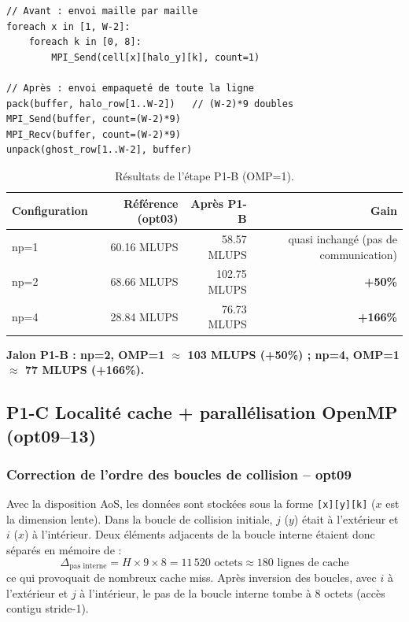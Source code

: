 \documentclass[a4paper,11pt,oneside]{report}
\newcommand{\code}[1]{\texttt{#1}}
\begin{document}
\begin{lstlisting}[language={}]
// Avant : envoi maille par maille
foreach x in [1, W-2]:
    foreach k in [0, 8]:
        MPI_Send(cell[x][halo_y][k], count=1)

// Après : envoi empaqueté de toute la ligne
pack(buffer, halo_row[1..W-2])   // (W-2)*9 doubles
MPI_Send(buffer, count=(W-2)*9)
MPI_Recv(buffer, count=(W-2)*9)
unpack(ghost_row[1..W-2], buffer)
\end{lstlisting}

\begin{table}[H]
\centering
\begin{tabular}{@{}lrrr@{}}
\toprule
\textbf{Configuration} & \textbf{Référence (opt03)} & \textbf{Après P1-B} & \textbf{Gain} \\
\midrule
np=1 & 60.16 MLUPS & 58.57 MLUPS & quasi inchangé (pas de communication) \\
np=2 & 68.66 MLUPS & 102.75 MLUPS & \textbf{+50\%} \\
np=4 & 28.84 MLUPS & 76.73 MLUPS  & \textbf{+166\%} \\
\bottomrule
\end{tabular}
\caption{Résultats de l'étape P1-B (OMP=1).}
\end{table}

\medskip
\textbf{Jalon P1-B : np=2, OMP=1 $\approx$ 103 MLUPS (+50\%) ; np=4, OMP=1 $\approx$ 77 MLUPS (+166\%).}

\subsection{P1-C \quad Localité cache + parallélisation OpenMP (opt09–13)}

\subsubsection{Correction de l'ordre des boucles de collision -- opt09}

Avec la disposition AoS, les données sont stockées sous la forme \code{[x][y][k]}
($x$ est la dimension lente). Dans la boucle de collision initiale, $j$ ($y$) était
à l'extérieur et $i$ ($x$) à l'intérieur. Deux éléments adjacents de la boucle interne
étaient donc séparés en mémoire de :
\[
  \Delta_\text{pas interne} = H \times 9 \times 8 = 11\,520 \text{ octets} \approx 180 \text{ lignes de cache}
\]
ce qui provoquait de nombreux cache miss. Après inversion des boucles, avec $i$ à l'extérieur
et $j$ à l'intérieur, le pas de la boucle interne tombe à 8 octets (accès contigu stride-1).
\end{document}
